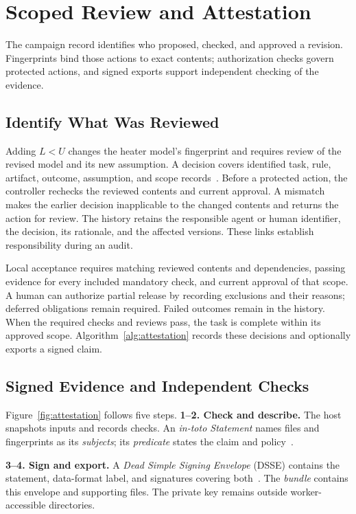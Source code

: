 \section{Scoped Review and Attestation}
\label{sec:attestation}
\label{sec:scoped-attestation}
The campaign record identifies who proposed, checked, and approved a revision. Fingerprints bind those actions to exact contents; authorization checks govern protected actions, and signed exports support independent checking of the evidence.

\subsection{Identify What Was Reviewed}
Adding $L<U$ changes the heater model's fingerprint and requires review of the revised model and its new assumption. A decision covers identified task, rule, artifact, outcome, assumption, and scope records~\cite{scpCheckpoint}. Before a protected action, the controller rechecks the reviewed contents and current approval. A mismatch makes the earlier decision inapplicable to the changed contents and returns the action for review. The history retains the responsible agent or human identifier, the decision, its rationale, and the affected versions. These links establish responsibility during an audit.



Local acceptance requires matching reviewed contents and dependencies, passing evidence for every included mandatory check, and current approval of that scope. A human can authorize partial release by recording exclusions and their reasons; deferred obligations remain required. Failed outcomes remain in the history. When the required checks and reviews pass, the task is complete within its approved scope. Algorithm~\ref{alg:attestation} records these decisions and optionally exports a signed claim.

\subsection{Signed Evidence and Independent Checks}
\label{sec:signed-export}
Figure~\ref{fig:attestation} follows five steps. \textbf{1--2. Check and describe.} The host snapshots inputs and records checks. An \emph{in-toto Statement} names files and fingerprints as its \emph{subjects}; its \emph{predicate} states the claim and policy~\cite{intotoStatement}.

\textbf{3--4. Sign and export.} A \emph{Dead Simple Signing Envelope} (DSSE) contains the statement, data-format label, and signatures covering both~\cite{dsse}. The \emph{bundle} contains this envelope and supporting files. The private key remains outside worker-accessible directories.

